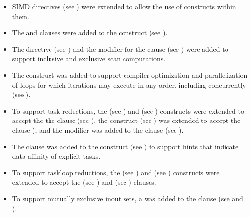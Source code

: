 \begin{itemize}
\item SIMD directives (see ) were extended
      to allow the use of  constructs within them.

\item The  and  clauses were added to the 
       construct (see ).

\item The  directive (see ) and the
       modifier for the  clause (see
      ) were added to support
      inclusive and exclusive scan computations.

\item The  construct was added to support compiler
      optimization and parallelization of loops for which iterations may
      execute in any order, including concurrently (see ).

\item To support task reductions, the  (see
      ) and  (see
      ) constructs were extended to
      accept the the  clause (see
      ), the 
      construct (see ) was extended
      to accept the  clause
      ), and the 
      modifier was added to the  clause (see
      ).

\item The  clause was added to the  construct
      (see ) to support hints that indicate 
      data affinity of explicit tasks.

\item To support taskloop reductions, the  (see
      ) and  (see
      ) constructs were extended
      to accept the  (see )
      and  (see )
      clauses.

\item To support mutually exclusive inout sets, a 
       was added to the  clause (see
       and ).


\end{itemize}

